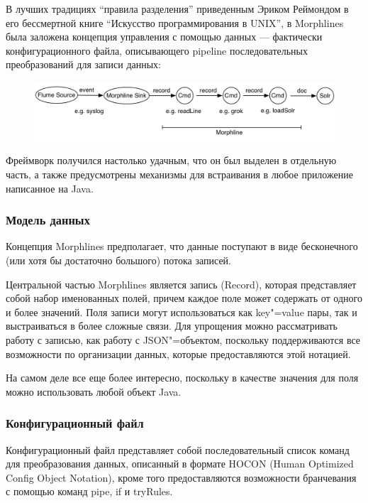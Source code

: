 \documentclass[10pt, a5paper]{article}
\begin{document}
В лучших традициях ``правила разделения'' приведенным Эриком Реймондом в его бессмертной книге ``Искусство программирования в UNIX'', в Morphlines была заложена концепция управления с помощью данных --- фактически конфигурационного файла, описывающего pipeline последовательных преобразований для записи данных:

\begin{figure}[h!]
  \centering
  \includegraphics[scale=0.5]{21_2014_morphlines.jpg}
\end{figure}

Фреймворк получился настолько удачным, что он был выделен в отдельную часть, а также предусмотрены механизмы для встраивания в любое приложение написанное на Java.

\subsubsection*{Модель данных}

Концепция Morphlines предполагает, что данные поступают в виде бесконечного (или хотя бы достаточно большого) потока записей.

Центральной частью Morphlines является запись (Record), которая представляет собой набор именованных полей, причем каждое поле может содержать от одного и более значений. Поля записи могут использоваться как key"=value пары, так и выстраиваться в более сложные связи. Для упрощения можно рассматривать работу с записью, как работу с JSON"=объектом, поскольку поддерживаются все возможности по организации данных, которые предоставляются этой нотацией.

На самом деле все еще более интересно, поскольку в качестве значения для поля можно использовать любой объект Java.

\subsubsection*{Конфигурационный файл}

Конфигурационный файл представляет собой последовательный список команд для преобразования данных, описанный в формате HOCON (Human Optimized Config Object Notation), кроме того предоставляются возможности бранчевания с помощью команд pipe, if и tryRules.
\end{document}
